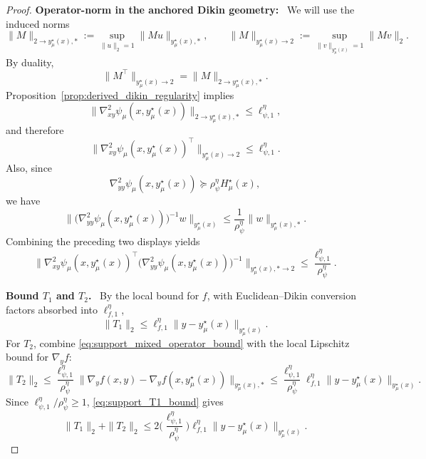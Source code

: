 \documentclass[10pt,a4paper]{amsart}
\newcommand{\proofstep}[1]{\par\smallskip\noindent\textbf{#1}\ }
\begin{document}
\begin{proof}
\proofstep{Operator-norm in the anchored Dikin geometry:}
We will use the induced norms
\[
\|M\|_{2\to y_\mu^\star(x),*}
:=
\sup_{\|u\|_2=1}\|Mu\|_{y_\mu^\star(x),*},
\qquad
\|M\|_{y_\mu^\star(x)\to 2}
:=
\sup_{\|v\|_{y_\mu^\star(x)}=1}\|Mv\|_2.
\]
By duality,
\[
\|M^\top\|_{y_\mu^\star(x)\to 2}
=
\|M\|_{2\to y_\mu^\star(x),*}.
\]
Proposition~\ref{prop:derived_dikin_regularity} implies
\begin{equation}
\label{eq:support_cross_operator_bound}
\|\nabla^2_{xy}\psi_\mu(x,y_\mu^\star(x))\|_{2\to y_\mu^\star(x),*}
\le
\ell_{\psi,1}^\eta,
\end{equation}
and therefore
\[
\|\nabla^2_{xy}\psi_\mu(x,y_\mu^\star(x))^\top\|_{y_\mu^\star(x)\to 2}
\le
\ell_{\psi,1}^\eta .
\]
Also, since
\[
\nabla^2_{yy}\psi_\mu(x,y_\mu^\star(x))
\succeq
\rho_\psi^\eta H_\mu^\star(x),
\]
we have
\begin{equation}
\label{eq:support_hinv_operator_bound}
\big\|
\big(\nabla^2_{yy}\psi_\mu(x,y_\mu^\star(x))\big)^{-1}w
\big\|_{y_\mu^\star(x)}
\le
\frac{1}{\rho_\psi^\eta}\|w\|_{y_\mu^\star(x),*}.
\end{equation}
Combining the preceding two displays yields
\begin{equation}
\label{eq:support_mixed_operator_bound}
\Big\|
\nabla^2_{xy}\psi_\mu(x,y_\mu^\star(x))^\top
\big(\nabla^2_{yy}\psi_\mu(x,y_\mu^\star(x))\big)^{-1}
\Big\|_{y_\mu^\star(x),*\to 2}
\le
\frac{\ell_{\psi,1}^\eta}{\rho_\psi^\eta}.
\end{equation}

\proofstep{Bound \(T_1\) and \(T_2\).}
By the local bound for \(f\), with Euclidean--Dikin conversion factors absorbed into
\(\ell_{f,1}^\eta\),
\begin{equation}
\label{eq:support_T1_bound}
\|T_1\|_2
\le
\ell_{f,1}^\eta\|y-y_\mu^\star(x)\|_{y_\mu^\star(x)}.
\end{equation}
For \(T_2\), combine \eqref{eq:support_mixed_operator_bound} with the local Lipschitz bound for
\(\nabla_y f\):
\[
\|T_2\|_2
\le
\frac{\ell_{\psi,1}^\eta}{\rho_\psi^\eta}
\|\nabla_y f(x,y)-\nabla_y f(x,y_\mu^\star(x))\|_{y_\mu^\star(x),*}
\le
\frac{\ell_{\psi,1}^\eta}{\rho_\psi^\eta}
\ell_{f,1}^\eta
\|y-y_\mu^\star(x)\|_{y_\mu^\star(x)} .
\]
Since \(\ell_{\psi,1}^\eta/\rho_\psi^\eta\ge1\), \eqref{eq:support_T1_bound} gives
\begin{equation}
\label{eq:support_f_terms_bound}
\|T_1\|_2+\|T_2\|_2
\le
2\Big(\frac{\ell_{\psi,1}^\eta}{\rho_\psi^\eta}\Big)
\ell_{f,1}^\eta
\|y-y_\mu^\star(x)\|_{y_\mu^\star(x)} .
\end{equation}


\end{proof}
\end{document}

